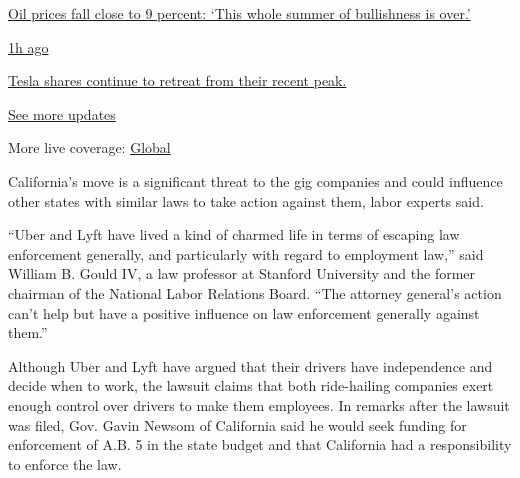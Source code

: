 \href{https://www.nytimes3xbfgragh.onion/live/2020/09/08/business/stock-market-today-coronavirus?action=click\&pgtype=Article\&state=default\&region=MAIN_CONTENT_1\&context=storylines_live_updates\#oil-prices-fall-close-to-9-percent-this-whole-summer-of-bullishness-is-over}{Oil
prices fall close to 9 percent: `This whole summer of bullishness is
over.'}

\href{https://www.nytimes3xbfgragh.onion/live/2020/09/08/business/stock-market-today-coronavirus?action=click\&pgtype=Article\&state=default\&region=MAIN_CONTENT_1\&context=storylines_live_updates\#tesla-shares-continue-to-retreat-from-their-recent-peak}{1h
ago}

\href{https://www.nytimes3xbfgragh.onion/live/2020/09/08/business/stock-market-today-coronavirus?action=click\&pgtype=Article\&state=default\&region=MAIN_CONTENT_1\&context=storylines_live_updates\#tesla-shares-continue-to-retreat-from-their-recent-peak}{Tesla
shares continue to retreat from their recent peak.}

\href{https://www.nytimes3xbfgragh.onion/live/2020/09/08/business/stock-market-today-coronavirus?action=click\&pgtype=Article\&state=default\&region=MAIN_CONTENT_1\&context=storylines_live_updates}{See
more updates}

More live coverage:
\href{https://www.nytimes3xbfgragh.onion/2020/09/08/world/covid-19-coronavirus.html?action=click\&pgtype=Article\&state=default\&region=MAIN_CONTENT_1\&context=storylines_live_updates}{Global}

California's move is a significant threat to the gig companies and could
influence other states with similar laws to take action against them,
labor experts said.

``Uber and Lyft have lived a kind of charmed life in terms of escaping
law enforcement generally, and particularly with regard to employment
law,'' said William B. Gould IV, a law professor at Stanford University
and the former chairman of the National Labor Relations Board. ``The
attorney general's action can't help but have a positive influence on
law enforcement generally against them.''

Although Uber and Lyft have argued that their drivers have independence
and decide when to work, the lawsuit claims that both ride-hailing
companies exert enough control over drivers to make them employees. In
remarks after the lawsuit was filed, Gov. Gavin Newsom of California
said he would seek funding for enforcement of A.B. 5 in the state budget
and that California had a responsibility to enforce the law.

